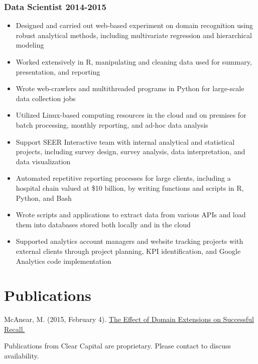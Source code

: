 \documentclass[11pt,a4paper,]{awesome-cv}
\providecommand{\tightlist}{%
	\setlength{\itemsep}{0pt}\setlength{\parskip}{0pt}}
\begin{document}
\hypertarget{data-scientist--2015}{%
\subsubsection{\texorpdfstring{Data Scientist
\hfill 2014-2015}{Data Scientist -2015}}\label{data-scientist--2015}}

\begin{itemize}
\tightlist
\item
  Designed and carried out web-based experiment on domain recognition
  using robust analytical methods, including multivariate regression and
  hierarchical modeling
\item
  Worked extensively in R, manipulating and cleaning data used for
  summary, presentation, and reporting
\item
  Wrote web-crawlers and multithreaded programs in Python for
  large-scale data collection jobs
\item
  Utilized Linux-based computing resources in the cloud and on premises
  for batch processing, monthly reporting, and ad-hoc data analysis
\item
  Support SEER Interactive team with internal analytical and statistical
  projects, including survey design, survey analysis, data
  interpretation, and data visualization
\item
  Automated repetitive reporting processes for large clients, including
  a hospital chain valued at \$10 billion, by writing functions and
  scripts in R, Python, and Bash
\item
  Wrote scripts and applications to extract data from various APIs and
  load them into databases stored both locally and in the cloud
\item
  Supported analytics account managers and website tracking projects
  with external clients through project planning, KPI identification,
  and Google Analytics code implementation
\end{itemize}

\hypertarget{publications}{%
\section{Publications}\label{publications}}

McAnear, M. (2015, February 4).
\href{https://www.linkedin.com/in/mcanearm/detail/treasury/position:542128688/?entityUrn=urn\%3Ali\%3Afsd_profileTreasuryMedia\%3A(ACoAAAnxGAcBvRV_hP_B01HidwhCRvx1_JiTN5k\%2C51020715)\&parentEntityUrn=urn\%3Ali\%3Afsd_profilePosition\%3A(ACoAAAnxGAcBvRV_hP_B01HidwhCRvx1_JiTN5k\%2C542128688)\&section=position\%3A542128688\&treasuryCount=1\&lipi=urn\%3Ali\%3Apage\%3Ad_flagship3_profile_view_base\%3B2Qy9E70TQSWz7FckC276aA\%3D\%3D\&licu=urn\%3Ali\%3Acontrol\%3Ad_flagship3_profile_view_base-treasury_thumbnail_cell}{The
Effect of Domain Extensions on Successful Recall.}

Publications from Clear Capital are proprietary. Please contact to
discuss availability.
\end{document}
